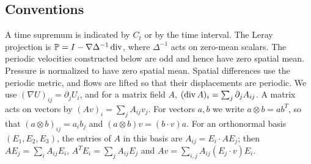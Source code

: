\subsection*{Conventions}
A time supremum is indicated by $C_t$ or by the time interval. The
Leray projection is
$\mathbb P=I-\nabla\Delta^{-1}\operatorname{div}$, where $\Delta^{-1}$ acts on zero-mean
scalars. The periodic velocities
constructed below are odd and hence have zero spatial mean.
Pressure is normalized to have zero spatial mean. Spatial differences use the periodic
metric, and flows are lifted so that their displacements are periodic.
We use $(\nabla U)_{ij}=\partial_jU_i$, and for a matrix field $A$,
$(\operatorname{div} A)_i=\sum_j\partial_jA_{ij}$. A matrix acts on vectors by
$(Av)_i=\sum_jA_{ij}v_j$. For vectors $a,b$ we write
$a\otimes b=ab^T$, so that $(a\otimes b)_{ij}=a_ib_j$ and
$(a\otimes b)v=(b\cdot v)a$. For an orthonormal basis $(E_1,E_2,E_3)$,
the entries of $A$ in this basis are $A_{ij}=E_i\cdot AE_j$; then
$AE_j=\sum_iA_{ij}E_i$, $A^TE_i=\sum_jA_{ij}E_j$ and
$Av=\sum_{i,j}A_{ij}(E_j\cdot v)E_i$.
